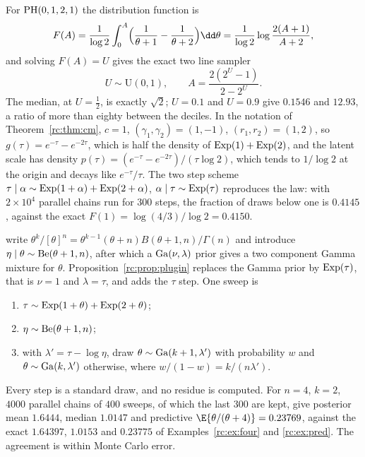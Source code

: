 \begin{example}\label{rc:ex:hhdraw}
For $\mathrm{PH}(0,1,2,1)$ the distribution function is
\[
F(A)=\frac{1}{\log2}\int_0^A\Bigl(\frac1{\theta+1}-\frac1{\theta+2}\Bigr)\dd\theta=\frac{1}{\log2}\log\frac{2(A+1)}{A+2},
\]
and solving $F(A)=U$ gives the exact two line sampler
\[
U\sim\mathrm{U}(0,1),\qquad A=\frac{2(2^U-1)}{2-2^U}.
\]
The median, at $U=\frac12$, is exactly $\sqrt2$; $U=0.1$ and $U=0.9$ give $0.1546$ and $12.93$, a ratio of more than eighty between the deciles. In the notation of Theorem~\ref{rc:thm:cm}, $c=1$, $(\gamma_1,\gamma_2)=(1,-1)$, $(r_1,r_2)=(1,2)$, so $g(\tau)=e^{-\tau}-e^{-2\tau}$, which is half the density of $\mathrm{Exp}(1)+\mathrm{Exp}(2)$, and the latent scale has density $p(\tau)=(e^{-\tau}-e^{-2\tau})/(\tau\log2)$, which tends to $1/\log2$ at the origin and decays like $e^{-\tau}/\tau$. The two step scheme $\tau\mid\alpha\sim\mathrm{Exp}(1+\alpha)+\mathrm{Exp}(2+\alpha)$, $\alpha\mid\tau\sim\mathrm{Exp}(\tau)$ reproduces the law: with $2\times10^4$ parallel chains run for 300 steps, the fraction of draws below one is $0.4145$, against the exact $F(1)=\log(4/3)/\log2=0.4150$.
\end{example}

\begin{example}\label{rc:ex:ewhh}
\citet{rc:escobar1995} write $\theta^k/[\theta]^n=\theta^{k-1}(\theta+n)B(\theta+1,n)/\Gamma(n)$ and introduce $\eta\mid\theta\sim\mathrm{Be}(\theta+1,n)$, after which a $\mathrm{Ga}(\nu,\lambda)$ prior gives a two component Gamma mixture for $\theta$. Proposition~\ref{rc:prop:plugin} replaces the Gamma prior by $\mathrm{Exp}(\tau)$, that is $\nu=1$ and $\lambda=\tau$, and adds the $\tau$ step. One sweep is
\begin{enumerate}[label=(\roman*),itemsep=1pt,topsep=2pt]
\item $\tau\sim\mathrm{Exp}(1+\theta)+\mathrm{Exp}(2+\theta)$;
\item $\eta\sim\mathrm{Be}(\theta+1,n)$;
\item with $\lambda'=\tau-\log\eta$, draw $\theta\sim\mathrm{Ga}(k+1,\lambda')$ with probability $w$ and $\theta\sim\mathrm{Ga}(k,\lambda')$ otherwise, where $w/(1-w)=k/(n\lambda')$.
\end{enumerate}
Every step is a standard draw, and no residue is computed. For $n=4$, $k=2$, $4000$ parallel chains of $400$ sweeps, of which the last 300 are kept, give posterior mean $1.6444$, median $1.0147$ and predictive $\E\{\theta/(\theta+4)\}=0.23769$, against the exact $1.64397$, $1.0153$ and $0.23775$ of Examples~\ref{rc:ex:four} and \ref{rc:ex:pred}. The agreement is within Monte Carlo error.
\end{example}

